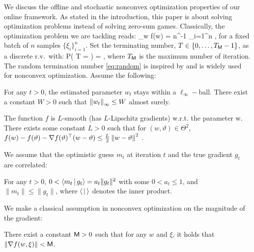 \documentclass[wcp]{jmlr}
\begin{document}
We discuss the offline and stochastic nonconvex optimization properties of our online framework.
As stated in the introduction, this paper is about solving optimization problems instead of solving zero-sum games.  
Classically, the optimization problem we are tackling reads:
\beq\label{eq:minproblem}
\min \limits_{w \in \Theta} f(w) \eqdef  \EE[ f(w, \xi)] = n^{-1} \sum_{i=1}^n  \EE[f(w, \xi_i)] \eqsp,
\eeq
for a fixed batch of $n$ samples $\{ \xi_i \}_{i=1}^n$.
Set the terminating number, $T \in \{0,\dots,T_{\sf M}-1\}$, as a discrete r.v.~with:
\beq \label{eq:random}
   P( T = \ell ) =  \eqsp,
\eeq
where $T_{\sf M}$ is the maximum number of iteration.
The random termination number \eqref{eq:random} is inspired by \citep{ghadimi2013stochastic} and is widely used for nonconvex optimization. 
Assume the following:
\begin{assumption}\label{ASS:BOUNDEDPARAM}
For any $t >0$, the estimated parameter $w_t$ stays within a $\ell_{\infty}-$ball. There exist a constant $W >0$ such that $\norm{w_t}_{\infty} \leq W$ almost surely.
\end{assumption}
\begin{assumption}\label{ass:smooth}
The function $f$ is $L$-smooth (has $L$-Lipschitz gradients) w.r.t. the parameter w.
There exists some constant $L > 0$ such that for $(w, \vartheta) \in \Theta^2$, $f(w) - f(\vartheta) - \nabla f(\vartheta)^\top(w - \vartheta) \leq \frac{L}{2} \norm{w - \vartheta}^2\eqsp.$
\end{assumption}
We assume that the optimistic guess $m_t$ at iteration $t$ and the true gradient $g_t$ are correlated:
\begin{assumption}\label{ass:guessbound}
For any $t >0$, $0 < \pscal{m_t}{ g_t} = a_t \|g_t\|^2$ with some $0<a_t\leq 1$, and $\| m_t \|\leq \| g_t \|$, where $\pscal{}{}$ denotes the inner product.
\end{assumption}

We make a classical assumption in nonconvex optimization on the magnitude of the gradient:
\begin{assumption}\label{ass:bounded}
There exist a constant $\major >0$ such that for any $w$ and $\xi$, it holds that $\norm{\nabla f(w, \xi)} < \major$.
\end{assumption}
\end{document}
